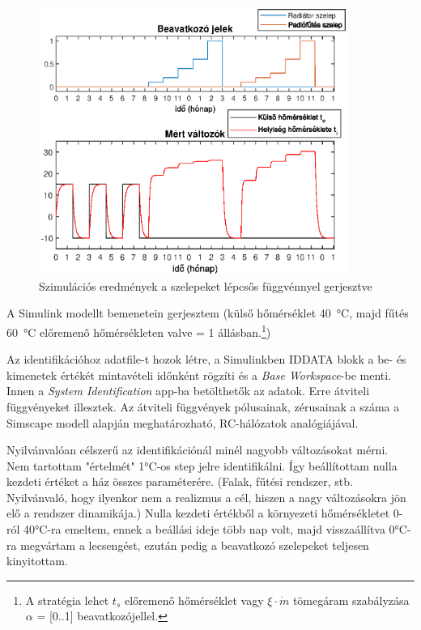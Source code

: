 \begin{figure}[H]
	\centering
	\includegraphics[trim=0 0 0 0, clip,width=0.9\textwidth]{figures/valve-nonlinearity}
	\caption{Szimulációs eredmények a szelepeket lépcsős függvénnyel gerjesztve}
	\label{fig:valve-stair}
\end{figure}




A Simulink modellt bemenetein gerjesztem (külső hőmérséklet \SI{40}{\celsius}, majd fűtés \SI{60}{\celsius} előremenő hőmérsékleten valve = 1 állásban.\footnote{A stratégia lehet $t_s$ előremenő hőmérséklet vagy $\xi \cdot \dot m$ tömegáram szabályzása $\alpha$ = [0..1] beavatkozójellel. })



Az identifikációhoz adatfile-t hozok létre, a Simulinkben IDDATA blokk a be- és kimenetek értékét mintavételi időnként rögzíti és a \textit{Base Workspace}-be menti. Innen a \textit{System Identification} app-ba betölthetők az adatok. %
Erre átviteli függvényeket illesztek. Az átviteli függvények pólusainak, zérusainak a száma a Simscape modell alapján meghatározható, RC-hálózatok analógiájával.

Nyilvánvalóan célszerű az identifikációnál minél nagyobb változásokat mérni. Nem tartottam "értelmét" 1\si{\celsius}-os step jelre identifikálni. Így beállítottam nulla kezdeti értéket a ház összes paraméterére. (Falak, fűtési rendszer, stb. Nyilvánvaló, hogy ilyenkor nem a realizmus a cél, hiszen a nagy változásokra jön elő a rendszer dinamikája.) Nulla kezdeti értékből a környezeti hőmérsékletet 0-ról 40\si{\celsius}-ra emeltem, ennek a beállási ideje több nap volt, majd visszaállítva 0\si{\celsius}-ra megvártam a lecsengést, ezután pedig a beavatkozó szelepeket teljesen kinyitottam. 

